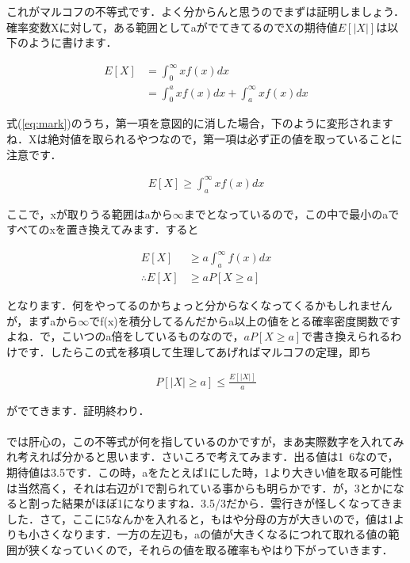 \documentclass[11pt,a4paper]{ujreport} 	%
\begin{document}
これがマルコフの不等式です．よく分からんと思うのでまずは証明しましょう．確率変数Xに対して，ある範囲としてaがでてきてるのでXの期待値$E[|X|]$は以下のように書けます．

\begin{align}
  E[X] &= \int_0^\infty xf(x)dx \nonumber \\
  &= \int_0^a xf(x)dx + \int_a^\infty x f(x)dx
  \label{eq:mark}
\end{align}

式(\ref{eq:mark})のうち，第一項を意図的に消した場合，下のように変形されますね．Xは絶対値を取られるやつなので，第一項は必ず正の値を取っていることに注意です．

\begin{align}
  E[X] \geq \int_a^\infty x f(x)dx
\end{align}

ここで，xが取りうる範囲はaから$\infty$までとなっているので，この中で最小のaですべてのxを置き換えてみます．すると

\begin{align}
  E[X] &\geq a\int_a^\infty f(x)dx\\
  \therefore E[X] &\geq aP[X\geq a]
\end{align}

となります．何をやってるのかちょっと分からなくなってくるかもしれませんが，まずaから$\infty$でf(x)を積分してるんだからa以上の値をとる確率密度関数ですよね．で，こいつのa倍をしているものなので，$aP[X\geq a]$で書き換えられるわけです．したらこの式を移項して生理してあげればマルコフの定理，即ち

\begin{align}
  P[|X|\geq a] \leq \frac{E[|X|]}{a}
\end{align}

がでてきます．証明終わり．\\
\\

では肝心の，この不等式が何を指しているのかですが，まあ実際数字を入れてみれ考えれば分かると思います．さいころで考えてみます．出る値は1~6なので，期待値は3.5です．この時，aをたとえば1にした時，1より大きい値を取る可能性は当然高く，それは右辺が1で割られている事からも明らかです．が，3とかになると割った結果がほぼ1になりますね．3.5/3だから．雲行きが怪しくなってきました．さて，ここに5なんかを入れると，もはや分母の方が大きいので，値は1よりも小さくなります．一方の左辺も，aの値が大きくなるにつれて取れる値の範囲が狭くなっていくので，それらの値を取る確率もやはり下がっていきます．\\
\\
\end{document}
